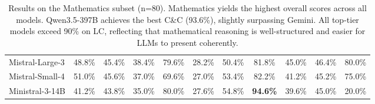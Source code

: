 \documentclass[11pt]{article}
\begin{document}
\begin{table}[!ht]
{\begin{tabular}{lcccc|cccc|cc}
Mistral-Large-3        & 48.8\% & 45.4\% & 38.4\% & 79.6\% & 28.2\% & 50.4\% & 81.8\% & 45.0\% & 46.4\% & 80.0\% \\
Mistral-Small-4        & 51.0\% & 45.6\% & 37.0\% & 69.6\% & 27.0\% & 53.4\% & 82.2\% & 41.2\% & 45.2\% & 75.0\% \\
Ministral-3-14B        & 41.2\% & 43.8\% & 35.0\% & 80.0\% & 27.6\% & 54.8\% & \textbf{94.6\%} & 39.6\% & 45.0\% & 20.0\% \\
\bottomrule
\end{tabular}}
\caption{Results on the Mathematics subset (n=80). Mathematics yields the highest overall scores across all models. Qwen3.5-397B achieves the best C\&C (93.6\%), slightly surpassing Gemini. All top-tier models exceed 90\% on LC, reflecting that mathematical reasoning is well-structured and easier for LLMs to present coherently.}
\label{tab:results-math}
\end{table}
\end{document}
